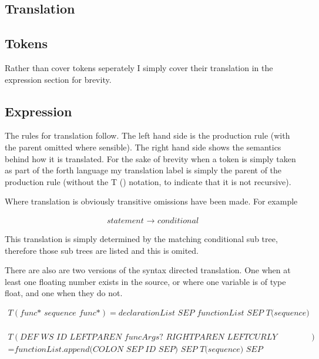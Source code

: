 \documentclass[a4paper,12pt]{article}
\begin{document}
\begin{landscape}
\section{Translation}
\subsection{Tokens}
Rather than cover tokens seperately I simply cover their translation in the expression section for brevity.
\subsection{Expression}

The rules for translation follow. The left hand side is the production rule (with the parent omitted where sensible). The right hand side shows the semantics behind how it is translated. For the sake of brevity when a token is simply taken as part of the forth language my translation label is simply the parent of the production rule (without the T () notation, to indicate that it is not recursive).

Where translation is obviously transitive omissions have been made. For example

\begin{equation} 
\begin{aligned}
    \textit{statement }\rightarrow \textit{ conditional}
\end{aligned}
\end{equation}

This translation is simply determined by the matching conditional sub tree, therefore those sub trees are listed and this is omited.

There are also are two versions of the syntax directed translation. One when at least one floating number exists in the source, or where one variable is of type float, and one when they do not.

\begin{equation} 
\begin{aligned}
    T( \textit{func* sequence func*}) = \textit{declarationList SEP functionList SEP T(sequence)} \\
\end{aligned}
\end{equation}

\begin{equation} 
\begin{aligned}
    T( \textit{DEF WS ID LEFTPAREN funcArgs? RIGHTPAREN LEFTCURLY sequence RIGHTCURLY})\\
    = \textit{functionList.append(COLON SEP ID SEP) SEP T(sequence) SEP SEMICOLON SEP} \\
\end{aligned}
\end{equation}


\end{landscape}
\end{document}
